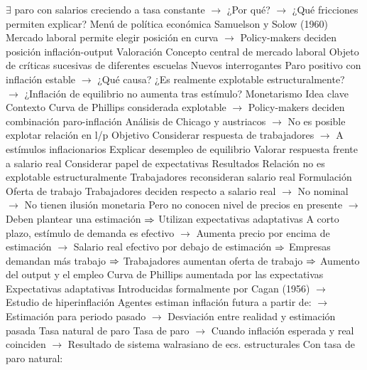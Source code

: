 \documentclass{nuevotema}
\begin{document}
\begin{esquemal}
				\4[] $\exists$ paro con salarios creciendo a tasa constante
				\4[] $\to$ ¿Por qué?
				\4[] $\to$ ¿Qué fricciones permiten explicar?
				\4 Menú de política económica
				\4[] Samuelson y Solow (1960)
				\4[] Mercado laboral permite elegir posición en curva
				\4[] $\to$ Policy-makers deciden posición inflación-output
			\3 Valoración
				\4 Concepto central de mercado laboral
				\4 Objeto de críticas sucesivas de diferentes escuelas
				\4 Nuevos interrogantes
				\4[] Paro positivo con inflación estable
				\4[] $\to$ ¿Qué causa?
				\4[] ¿Es realmente explotable estructuralmente?
				\4[] $\to$ ¿Inflación de equilibrio no aumenta tras estímulo?
		\2 Monetarismo
			\3 Idea clave
				\4 Contexto
				\4[] Curva de Phillips considerada explotable
				\4[] $\to$ Policy-makers deciden combinación paro-inflación
				\4[] Análisis de Chicago y austriacos
				\4[] $\to$ No es posible explotar relación en l/p
				\4 Objetivo
				\4[] Considerar respuesta de trabajadores
				\4[] $\to$ A estímulos inflacionarios
				\4[] Explicar desempleo de equilibrio
				\4[] Valorar respuesta frente a salario real
				\4[] Considerar papel de expectativas
				\4 Resultados
				\4[] Relación no es explotable estructuralmente
				\4[] Trabajadores reconsideran salario real
			\3 Formulación
				\4 Oferta de trabajo
				\4[] Trabajadores deciden respecto a salario real
				\4[] $\to$ No nominal
				\4[] $\to$ No tienen ilusión monetaria
				\4[] Pero no conocen nivel de precios en presente
				\4[] $\to$ Deben plantear una estimación
				\4[] $\Rightarrow$ Utilizan expectativas adaptativas
				\4[] A corto plazo, estímulo de demanda es efectivo
				\4[] $\to$ Aumenta precio por encima de estimación
				\4[] $\to$ Salario real efectivo por debajo de estimación
				\4[] $\Rightarrow$ Empresas demandan más trabajo
				\4[] $\Rightarrow$ Trabajadores aumentan oferta de trabajo
				\4[] $\Rightarrow$ Aumento del output y el empleo
				\4 Curva de Phillips aumentada por las expectativas
				\4[] 
				\4 Expectativas adaptativas
				\4[] Introducidas formalmente por Cagan (1956)
				\4[] $\to$ Estudio de hiperinflación
				\4[] Agentes estiman inflación futura a partir de:
				\4[] $\to$ Estimación para periodo pasado
				\4[] $\to$ Desviación entre realidad y estimación pasada
				\4[] 
				\4 Tasa natural de paro
				\4[] Tasa de paro
				\4[] $\to$ Cuando inflación esperada y real coinciden
				\4[] $\to$ Resultado de sistema walrasiano de ecs. estructurales
				\4[] Con tasa de paro natural:

\end{esquemal}
\end{document}
